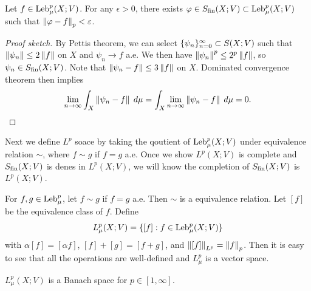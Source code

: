 \documentclass[a4paper]{article}
\begin{document}
\begin{thm}
Let $f \in \operatorname{Leb}_\mu^p (X; V)$. For any $\epsilon > 0$,
there exists $\varphi \in S_{\text{fin}}(X; V) \subset \operatorname{Leb}_\mu^p (X; V)$
such that $\left\lVert \varphi - f\right\rVert_p < \varepsilon$.
\end{thm}

\begin{proof}[Proof sketch]
By Pettis theorem, we can select $\{ \psi_n \}_{n=0}^\infty \subset
S(X; V)$ such that $\left\lVert \psi_n\right\rVert \leq 2 \left\lVert f\right\rVert$
on $X$ and $\psi_n \to f$ a.e. We then have
$\left\lVert \psi_n\right\rVert^p \leq 2^p \left\lVert f\right\rVert$, so $\psi_n
\in S_{\text{fin}}(X ; V)$. Note that $\left\lVert \psi_n - f\right\rVert \leq
3 \left\lVert f\right\rVert$ on $X$. Dominated convergence theorem then implies
\[
\lim_{n \to \infty} \int_X \left\lVert \psi_n - f\right\rVert \; d \mu
= \int_X \lim_{n \to \infty} \left\lVert \psi_n - f\right\rVert \; d \mu
= 0.
\]
\end{proof}

Next we define $L^p$ soace by taking the qoutient of
$\operatorname{Leb}_\mu^p (X; V)$ under equivalence relation $\sim$,
where $f \sim g$ if $f = g$ a.e. Once we show
$L^p(X; V)$ is complete and $S_{\text{fin}}(X; V)$ is denes in
$L^p(X; V)$, we will know the completion of
$S_{\text{fin}}(X; V)$ is $L^p(X; V)$.

\begin{defi}[$L^p$ spaces]
For $f, g \in \operatorname{Leb}_\mu^p$, let $f \sim g$ if
$f = g$ a.e. Then $\sim$ is a equivalence relation.
Let $[f]$ be the equivalence class of $f$. Define
\[
L^p_\mu (X; V) = \{[f] : f \in \operatorname{Leb}_\mu^p (X; V)\}
\]
with $\alpha [f] = [\alpha f]$, $[f] + [g] = [f + g]$,
and $\left\lVert [f]\right\rVert_{L^p} = \left\lVert f\right\rVert_p$. Then it is easy to see
that all the operations are well-defined and $L^p_\mu$ is
a vector space.
\end{defi}

\begin{thm}
$L^p_\mu(X; V)$ is a Banach space for $p \in [1, \infty]$.
\end{thm}
\end{document}
